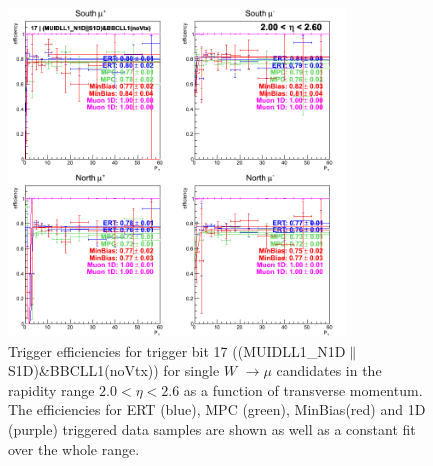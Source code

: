 \begin{figure}[h!]

  \centering

  \includegraphics[width=0.8\textwidth]{./figures/run13_trigeffipt_eta2_trig17_lin.png}
  \caption{\label{fig:run13_trigeffipt_eta2_nper0_trig17_lin} Trigger efficiencies for trigger bit 17 ((MUIDLL1\_N1D$\|$S1D)\&BBCLL1(noVtx)) for single $W$ $\rightarrow \mu$ candidates in the rapidity range $ 2.0 < \eta < 2.6$ as a function of transverse momentum. The efficiencies for ERT (blue), MPC (green), MinBias(red) and 1D (purple) triggered data samples are shown as well as a constant fit over the whole range.}

\end{figure}
\clearpage
